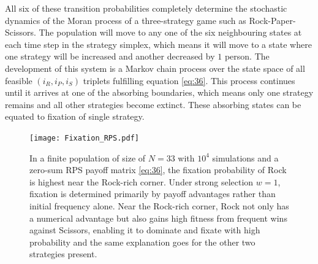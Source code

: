 \documentclass{article}
\begin{document}
All six of these transition probabilities completely determine the stochastic dynamics of the Moran process of a three-strategy game such as Rock-Paper-Scissors.
The population will move to any one of the six neighbouring states at each time step in the strategy simplex, which means it will move to a state where one strategy will be increased and another decreased by $1$ person.
The development of this system is a Markov chain process over the state space of all feasible $(i_R, i_P, i_S)$ triplets fulfilling equation \eqref{eq:36}.
This process continues until it arrives at one of the absorbing boundaries, which means only one strategy remains and all other strategies become extinct.
These absorbing states can be equated to fixation of single strategy.
\begin{figure}[H]
    \centering
    \texttt{[image: Fixation\_RPS.pdf]}
    \caption{In a finite population of size of $N = 33$ with $ 10^4$ simulations and a zero-sum RPS payoff matrix \eqref{eq:36}, the fixation probability of Rock is highest near the Rock-rich corner. Under strong selection $w=1$, fixation is determined primarily by payoff advantages rather than initial frequency alone. Near the Rock-rich corner, Rock not only has a numerical advantage but also gains high fitness from frequent wins against Scissors, enabling it to dominate and fixate with high probability and the same explanation goes for the other two strategies present.}
    \label{fig:6}
\end{figure}
\end{document}

